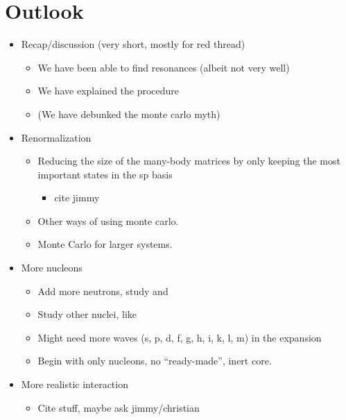 \documentclass[../main/report.tex]{subfiles}
\begin{document}
\chapter{Outlook}
\label{cha:outlook}

\begin{itemize}
  \item Recap/discussion (very short, mostly for red thread)
  \begin{itemize}
    \item We have been able to find resonances (albeit not very well)
    \item We have explained the procedure
    \item (We have debunked the monte carlo myth)
  \end{itemize}
  \item Renormalization
  \begin{itemize}
    \item Reducing the size of the many-body matrices by only keeping the most important states in the sp basis
    \begin{itemize}
      \item cite jimmy
    \end{itemize}
    \item Other ways of using monte carlo.
    \item Monte Carlo for larger systems.
  \end{itemize}
  \item More nucleons
  \begin{itemize}
    \item Add more neutrons, study  and 
    \item Study other nuclei, like 
    \item Might need more waves (s, p, d, f, g, h, i, k, l, m) in the expansion
    \item Begin with only nucleons, no ``ready-made'', inert core.
  \end{itemize}
  \item More realistic interaction
  \begin{itemize}
    \item Cite stuff, maybe ask jimmy/christian
  \end{itemize}
\end{itemize}
\end{document}
